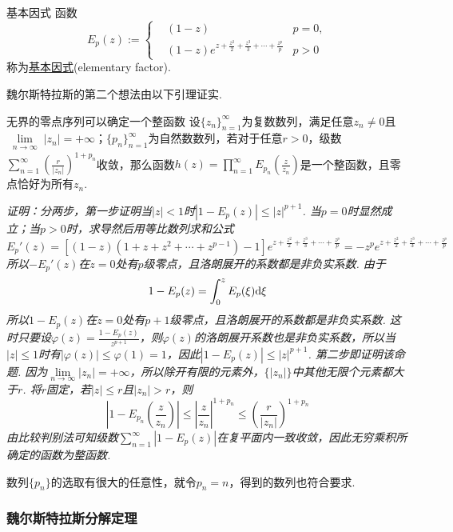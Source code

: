 \begin{definition}{基本因式}
    函数
    \[E_p(z) := \left\{\begin{aligned} & (1-z) & p=0, \\ & (1-z)e^{z+\frac{z^2}{2}+\frac{z^3}{3}+\cdots+\frac{z^p}{p}} & p > 0 \end{aligned}\right.\]
    称为\uline{基本因式}(elementary factor).
\end{definition}

魏尔斯特拉斯的第二个想法由以下引理证实.
\begin{lemma}{无界的零点序列可以确定一个整函数}
    设\(\{z_n\}_{n=1}^{\infty}\)为复数数列，满足任意\(z_n \neq 0\)且\(\lim \limits_{\substack{n \to \infty}} |z_n|=+\infty\)；\(\{p_n\}_{n=1}^{\infty}\)为自然数数列，若对于任意\(r>0\)，级数\(\displaystyle{\sum_{n=1}^{\infty}\left(\frac{r}{|z_n|}\right)^{1+p_n}}\)收敛，那么函数\(\displaystyle{h(z)=\prod_{n=1}^{\infty}E_{p_n}\left(\frac{z}{z_n}\right)}\)是一个整函数，且零点恰好为所有\(z_n\).
\end{lemma}
\textit{
    证明：分两步，第一步证明当\(|z|<1\)时\(|1-E_p(z)| \leq |z|^{p+1}\). 当\(p=0\)时显然成立；当\(p > 0\)时，求导然后用等比数列求和公式
    \[E_p'(z) = [(1-z)(1+z+z^2+\cdots+z^{p-1})-1]e^{z+\frac{z^2}{2}+\frac{z^3}{3}+\cdots+\frac{z^p}{p}} = -z^pe^{z+\frac{z^2}{2}+\frac{z^3}{3}+\cdots+\frac{z^p}{p}}\]
    所以\(-E_p'(z)\)在\(z=0\)处有\(p\)级零点，且洛朗展开的系数都是非负实系数. 由于
    \[1-E_p(z)=\int_0^z E_p(\xi){\rm d}\xi\]
    所以\(1-E_p(z)\)在\(z=0\)处有\(p+1\)级零点，且洛朗展开的系数都是非负实系数. 这时只要设\(\displaystyle{\varphi(z)=\frac{1-E_p(z)}{z^{p+1}}}\)，则\(\varphi(z)\)的洛朗展开系数也是非负实系数，所以当\(|z| \leq 1\)时有\(|\varphi(z)|\leq \varphi(1)=1\)，因此\(|1-E_p(z)| \leq |z|^{p+1}\).
    第二步即证明该命题. 因为\(\lim \limits_{n \to \infty} |z_n| = +\infty\)，所以除开有限的元素外，\(\{|z_n|\}\)中其他无限个元素都大于\(r\). 将\(r\)固定，若\(|z|\leq r\)且\(|z_n|>r\)，则
    \[\left|1-E_{p_n}\left(\frac{z}{z_n}\right)\right| \leq \left|\frac{z}{z_n}\right|^{1+p_n} \leq \left(\frac{r}{|z_n|}\right)^{1+p_n}\]
    由比较判别法可知级数\(\displaystyle{\sum_{n=1}^{\infty}|1-E_p(z)|}\)在复平面内一致收敛，因此无穷乘积所确定的函数为整函数.
}

数列\(\{p_n\}\)的选取有很大的任意性，就令\(p_n=n\)，得到的数列也符合要求.

\subsubsection{魏尔斯特拉斯分解定理}


